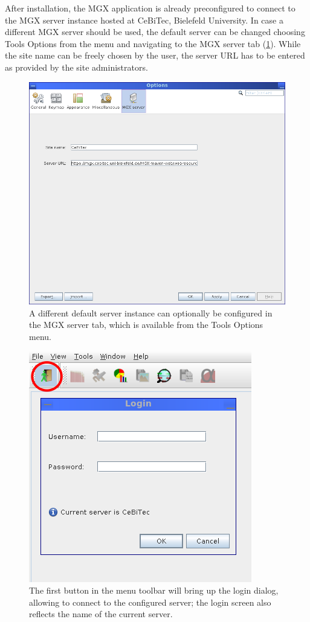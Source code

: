 After installation, the MGX application is already preconfigured to connect to the 
MGX server instance hosted at CeBiTec, Bielefeld University. In case a different MGX server
should be used, the default server can be changed choosing Tools \textrightarrow Options from the menu
and navigating to the MGX server tab (\ref{config-site}). While the site name can be freely
chosen by the user, the server URL has to be entered as provided by the site administrators.

\begin{figure}[H]
\centering
\includegraphics[width=.8\textwidth]{img/mgx/config-site}
\caption[Server configuration]{A different default server instance can optionally be configured in the MGX 
server tab, which is available from the Tools \textrightarrow Options menu.}
\label{config-site}
\end{figure}


\begin{figure}[H]
\centering
\includegraphics[width=.6\textwidth]{img/mgx/login}
\caption[Login screen]{The first button in the menu toolbar will bring up the login dialog, allowing to connect to the configured server; the login screen also reflects the name of the current server.}
\label{login-screen}
\end{figure}

